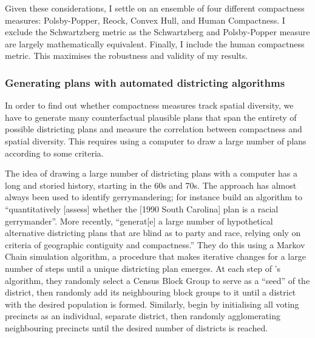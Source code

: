 \documentclass[]{article}
\begin{document}
Given these considerations, I settle on an ensemble of four different
compactness measures: Polsby-Popper, Reock, Convex Hull, and Human
Compactness. I exclude the Schwartzberg metric as the Schwartzberg and
Polsby-Popper measure are largely mathematically equivalent. Finally, I
include the human compactness metric. This maximises the robustness and
validity of my results.

\hypertarget{generating-plans-with-automated-districting-algorithms}{%
\subsubsection{Generating plans with automated districting
algorithms}\label{generating-plans-with-automated-districting-algorithms}}

In order to find out whether compactness measures track spatial
diversity, we have to generate many counterfactual plausible plans that
span the entirety of possible districting plans and measure the
correlation between compactness and spatial diversity. This requires
using a computer to draw a large number of plans according to some
criteria.

The idea of drawing a large number of districting plans with a computer
has a long and storied history, starting in the 60s and 70s. The
approach has almost always been used to identify gerrymandering; for
instance \cite{ccd2000} build an algorithm to ``quantitatively
{[}assess{]} whether the {[}1990 South Carolina{]} plan is a racial
gerrymander''. More recently, \cite{cr2013} ``generat{[}e{]} a large
number of hypothetical alternative districting plans that are blind as
to party and race, relying only on criteria of geographic contiguity and
compactness.'' They do this using a Markov Chain simulation algorithm, a
procedure that makes iterative changes for a large number of steps until
a unique districting plan emerges. At each step of
\citeauthor{ccd2000}'s algorithm, they randomly select a Census Block
Group to serve as a ``seed'' of the district, then randomly add its
neighbouring block groups to it until a district with the desired
population is formed. Similarly, \citeauthor{cr2013} begin by
initialising all voting precincts as an individual, separate district,
then randomly agglomerating neighbouring precincts until the desired
number of districts is reached.
\end{document}
